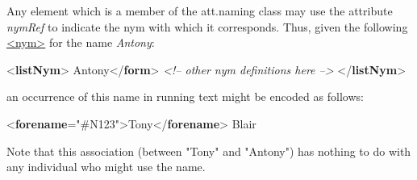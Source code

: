 Any element which is a member of the \textsf{att.naming} class may use the attribute {\itshape nymRef} to indicate the nym with which it corresponds. Thus, given the following \hyperref[TEI.nym]{<nym>} for the name \textit{Antony}: \par\bgroup{}\exampleFont \begin{shaded}\noindent\mbox{}{<\textbf{listNym}>}\mbox{}\newline 
{}\mbox{}\newline 
\hspace*{1em}Antony{</\textbf{form}>}\mbox{}\newline 
{}\mbox{}\newline 
\textit{<!-- other nym definitions here -->}\mbox{}\newline 
{</\textbf{listNym}>}\end{shaded}\egroup\par \noindent  an occurrence of this name in running text might be encoded as follows: \par\bgroup{}\exampleFont \begin{shaded}\noindent\mbox{}{<\textbf{forename}\hspace*{1em}{nymRef}="{\#N123}">}Tony{</\textbf{forename}>} Blair \end{shaded}\egroup\par \noindent  Note that this association (between "Tony" and "Antony") has nothing to do with any individual who might use the name.\par
